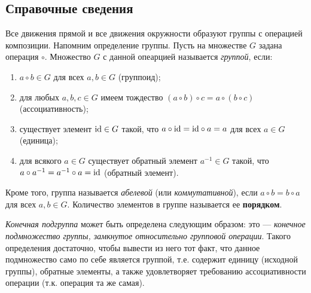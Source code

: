 \subsection*{Справочные сведения}

Все движения прямой и все движения окружности образуют группы с операцией композиции. Напомним определение группы.
Пусть на множестве $G$ задана операция $\circ$. Множество $G$ с данной опеарцией называется \textit{группой}, если:
\begin{enumerate}[G1]
\item $a\circ b\in G$ для всех $a,b\in G$ (группоид);
\item для любых $a,b,c\in G$ имеем тождество $(a\circ b)\circ c=a\circ (b\circ c)$ (ассоциативность);
\item существует элемент $\mathrm{id}\in G$ такой, что $a\circ \mathrm{id}=\mathrm{id}\circ a=a$ для всех $a\in G$ (единица);
\item для всякого $a\in G$ существует обратный элемент $a^{-1}\in G$ такой, что $a\circ a^{-1}=a^{-1}\circ a=\mathrm{id}$ (обратный элемент).
\end{enumerate}

Кроме того, группа называется \textit{абелевой} (или \textit{коммутативной}), если $a\circ b=b\circ a$ для всех $a,b\in G$. Количество элементов в группе называется ее \textbf{порядком}.

\textit{Конечная подгруппа} может быть определена следующим образом: это --- \textit{конечное подмножество группы, замкнутое относительно групповой операции}. Такого определения достаточно, чтобы вывести из него тот факт, что данное подмножество само по себе является группой, т.е. содержит единицу (исходной группы), обратные элементы, а также удовлетворяет требованию ассоциативности операции (т.к. операция та же самая).

